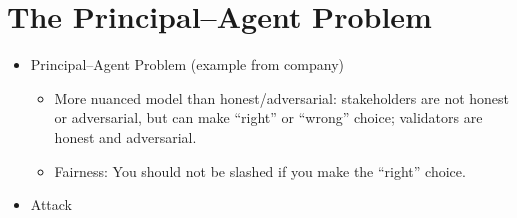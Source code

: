 \section{The Principal--Agent Problem}

\begin{itemize}
    \item Principal--Agent Problem (example from company)
        \begin{itemize}
            \item More nuanced model than honest/adversarial: stakeholders are not honest or adversarial, but can make ``right'' or ``wrong'' choice; validators are honest and adversarial.
            \item Fairness: You should not be slashed if you make the ``right'' choice.
        \end{itemize}
    \item Attack
\end{itemize}